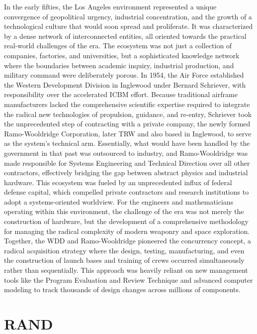 In the early fifties, the Los Angeles environment represented a unique convergence of geopolitical urgency, industrial concentration, and the growth of a technological culture that would soon spread and proliferate. It was characterized by a dense network of interconnected entities, all oriented towards the practical real-world challenges of the era. The ecosystem was not just a collection of companies, factories, and universities, but a sophisticated knowledge network where the boundaries between academic inquiry, industrial production, and military command were deliberately porous. In 1954, the Air Force established the Western Development Division in Inglewood under Bernard Schriever, with responsibility over the accelerated ICBM effort. Because traditional airframe manufacturers lacked the comprehensive scientific expertise required to integrate the radical new technologies of propulsion, guidance, and re-entry, Schriever took the unprecedented step of contracting with a private company, the newly formed Ramo-Wooldridge Corporation, later TRW and also based in Inglewood, to serve as the system's technical arm. Essentially, what would have been handled by the government in that past was outsourced to industry, and Ramo-Wooldridge was made responsible for Systems Engineering and Technical Direction over all other contractors, effectively bridging the gap between abstract physics and industrial hardware. 
This ecosystem was fueled by an unprecedented influx of federal defense capital, which compelled private contractors and research institutions to adopt a systems-oriented worldview. For the engineers and mathematicians operating within this environment, the challenge of the era was not merely the construction of hardware, but the development of a comprehensive methodology for managing the radical complexity of modern weaponry and space exploration. Together, the WDD and Ramo-Wooldridge pioneered the concurrency concept, a radical acquisition strategy where the design, testing, manufacturing, and even the construction of launch bases and training of crews occurred simultaneously rather than sequentially. This approach was heavily reliant on new management tools like the Program Evaluation and Review Technique and advanced computer modeling to track thousands of design changes across millions of components.

\section{RAND}

